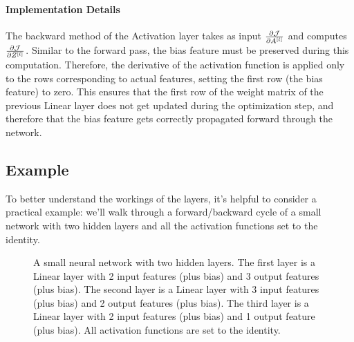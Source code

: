 \paragraph{Implementation Details} The backward method of the Activation layer takes as input $\pdv{\mathcal{J}}{A^{[l]}}$ and computes $\pdv{\mathcal{J}}{Z^{[l]}}$. Similar to the forward pass, the bias feature must be preserved during this computation. Therefore, the derivative of the activation function is applied only to the rows corresponding to actual features, setting the first row (the bias feature) to zero. This ensures that the first row of the weight matrix of the previous Linear layer does not get updated during the optimization step, and therefore that the bias feature gets correctly propagated forward through the network.

\subsection{Example}
To better understand the workings of the layers, it's helpful to consider a practical example: we'll walk through a forward/backward cycle of a small network with two hidden layers and all the activation functions set to the identity.

\begin{figure}[h]
    \centering
    \caption{A small neural network with two hidden layers. The first layer is a Linear layer with 2 input features (plus bias) and 3 output features (plus bias). The second layer is a Linear layer with 3 input features (plus bias) and 2 output features (plus bias). The third layer is a Linear layer with 2 input features (plus bias) and 1 output feature (plus bias). All activation functions are set to the identity.}
    \label{fig:small-nn}
\end{figure}

